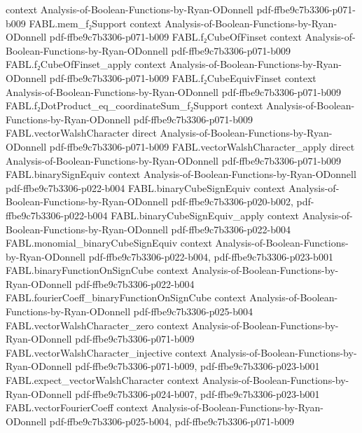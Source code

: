 \begin{theorem}
  {context}
  {Analysis-of-Boolean-Functions-by-Ryan-ODonnell}
  {pdf-ffbe9c7b3306-p071-b009}
\proofstep
  {FABL.mem_f₂Support}
  {context}
  {Analysis-of-Boolean-Functions-by-Ryan-ODonnell}
  {pdf-ffbe9c7b3306-p071-b009}
\proofstep
  {FABL.f₂CubeOfFinset}
  {context}
  {Analysis-of-Boolean-Functions-by-Ryan-ODonnell}
  {pdf-ffbe9c7b3306-p071-b009}
\proofstep
  {FABL.f₂CubeOfFinset_apply}
  {context}
  {Analysis-of-Boolean-Functions-by-Ryan-ODonnell}
  {pdf-ffbe9c7b3306-p071-b009}
\proofstep
  {FABL.f₂CubeEquivFinset}
  {context}
  {Analysis-of-Boolean-Functions-by-Ryan-ODonnell}
  {pdf-ffbe9c7b3306-p071-b009}
\proofstep
  {FABL.f₂DotProduct_eq_coordinateSum_f₂Support}
  {context}
  {Analysis-of-Boolean-Functions-by-Ryan-ODonnell}
  {pdf-ffbe9c7b3306-p071-b009}
\proofstep
  {FABL.vectorWalshCharacter}
  {direct}
  {Analysis-of-Boolean-Functions-by-Ryan-ODonnell}
  {pdf-ffbe9c7b3306-p071-b009}
\proofstep
  {FABL.vectorWalshCharacter_apply}
  {direct}
  {Analysis-of-Boolean-Functions-by-Ryan-ODonnell}
  {pdf-ffbe9c7b3306-p071-b009}
\proofstep
  {FABL.binarySignEquiv}
  {context}
  {Analysis-of-Boolean-Functions-by-Ryan-ODonnell}
  {pdf-ffbe9c7b3306-p022-b004}
\proofstep
  {FABL.binaryCubeSignEquiv}
  {context}
  {Analysis-of-Boolean-Functions-by-Ryan-ODonnell}
  {pdf-ffbe9c7b3306-p020-b002,
    pdf-ffbe9c7b3306-p022-b004}
\proofstep
  {FABL.binaryCubeSignEquiv_apply}
  {context}
  {Analysis-of-Boolean-Functions-by-Ryan-ODonnell}
  {pdf-ffbe9c7b3306-p022-b004}
\proofstep
  {FABL.monomial_binaryCubeSignEquiv}
  {context}
  {Analysis-of-Boolean-Functions-by-Ryan-ODonnell}
  {pdf-ffbe9c7b3306-p022-b004,
    pdf-ffbe9c7b3306-p023-b001}
\proofstep
  {FABL.binaryFunctionOnSignCube}
  {context}
  {Analysis-of-Boolean-Functions-by-Ryan-ODonnell}
  {pdf-ffbe9c7b3306-p022-b004}
\proofstep
  {FABL.fourierCoeff_binaryFunctionOnSignCube}
  {context}
  {Analysis-of-Boolean-Functions-by-Ryan-ODonnell}
  {pdf-ffbe9c7b3306-p025-b004}
\proofstep
  {FABL.vectorWalshCharacter_zero}
  {context}
  {Analysis-of-Boolean-Functions-by-Ryan-ODonnell}
  {pdf-ffbe9c7b3306-p071-b009}
\proofstep
  {FABL.vectorWalshCharacter_injective}
  {context}
  {Analysis-of-Boolean-Functions-by-Ryan-ODonnell}
  {pdf-ffbe9c7b3306-p071-b009,
    pdf-ffbe9c7b3306-p023-b001}
\proofstep
  {FABL.expect_vectorWalshCharacter}
  {context}
  {Analysis-of-Boolean-Functions-by-Ryan-ODonnell}
  {pdf-ffbe9c7b3306-p024-b007,
    pdf-ffbe9c7b3306-p023-b001}
\proofstep
  {FABL.vectorFourierCoeff}
  {context}
  {Analysis-of-Boolean-Functions-by-Ryan-ODonnell}
  {pdf-ffbe9c7b3306-p025-b004,
    pdf-ffbe9c7b3306-p071-b009}

\end{theorem}
